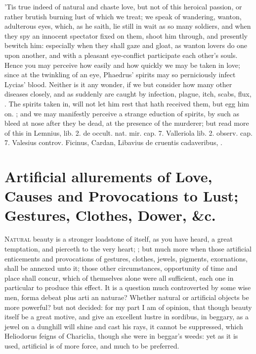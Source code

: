 'Tis true indeed of natural and chaste love, but not of this heroical
passion, or rather brutish burning lust of which we treat; we speak of
wandering, wanton, adulterous eyes, which, as he saith, lie still
in wait as so many soldiers, and when they spy an innocent spectator
fixed on them, shoot him through, and presently bewitch him: especially
when they shall gaze and gloat, as wanton lovers do one upon another,
and with a pleasant eye-conflict participate each other's souls. Hence
you may perceive how easily and how quickly we may be taken in love;
since at the twinkling of an eye, Phaedrus' spirits may so perniciously
infect Lycias' blood. Neither is it any wonder, if we but
consider how many other diseases closely, and as suddenly are caught by
infection, plague, itch, scabs, flux, \etc{}. The spirits taken in, will
not let him rest that hath received them, but egg him on. ; and we may manifestly perceive
a strange eduction of spirits, by such as bleed at nose after they be
dead, at the presence of the murderer; but read more of this in
Lemnius, lib. 2. de occult. nat. mir. cap. 7. Valleriola lib. 2.
observ. cap. 7. Valesius controv. Ficinus, Cardan, Libavius de cruentis
cadaveribus, \etc{}.

\section[Artificial allures of Love]{Artificial allurements of Love, Causes and Provocations to Lust; Gestures, Clothes, Dower, \&c.}

\lettrine{N}{atural} beauty is a stronger loadstone of itself, as you have heard, a
great temptation, and pierceth to the very heart; ; but much more when those
artificial enticements and provocations of gestures, clothes, jewels,
pigments, exornations, shall be annexed unto it; those other
circumstances, opportunity of time and place shall concur, which of
themselves alone were all sufficient, each one in particular to produce
this effect. It is a question much controverted by some wise men, forma
debeat plus arti an naturae? Whether natural or artificial objects be
more powerful? but not decided: for my part I am of opinion, that
though beauty itself be a great motive, and give an excellent lustre in
sordibus, in beggary, as a jewel on a dunghill will shine and cast his
rays, it cannot be suppressed, which Heliodorus feigns of Chariclia,
though she were in beggar's weeds: yet as it is used, artificial is of
more force, and much to be preferred.


